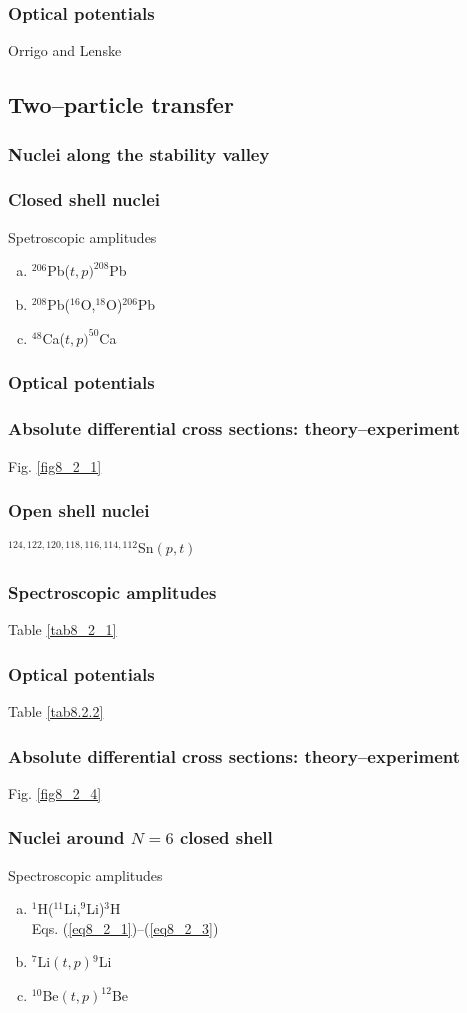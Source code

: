 \begin{subappendices}
\subsubsection{Optical potentials}
Orrigo and Lenske
\subsection{Two--particle transfer}
\subsubsection{Nuclei along the stability valley}
\subsubsection{Closed shell nuclei}
Spetroscopic amplitudes
\begin{enumerate}[a)]
\item{$^{206}$Pb($t,p)^{208}$Pb}
\item{$^{208}$Pb($^{16}$O,$^{18}$O)$^{206}$Pb}
\item{$^{48}$Ca($t,p)^{50}$Ca}
\end{enumerate}
\subsubsection{Optical potentials}
\subsubsection{Absolute differential cross sections: theory--experiment}
Fig. \ref{fig8_2_1}
\subsubsection{Open shell nuclei}
$^{124,122,120,118,116,114,112}$Sn$(p,t)$
\subsubsection{Spectroscopic amplitudes}
Table \ref{tab8_2_1}
\subsubsection{Optical potentials}
Table \ref{tab8.2.2}
\subsubsection{Absolute differential cross sections: theory--experiment}
Fig. \ref{fig8_2_4}
\subsubsection{Nuclei around $N=6$ closed shell}
Spectroscopic amplitudes
\begin{enumerate}[a)]
\item{$^{1}$H($^{11}$Li,$^{9}$Li)$^{3}$H\\ Eqs. (\ref{eq8_2_1})--(\ref{eq8_2_3})}
\item{$^{7}$Li$(t,p)$$^9$Li }
\item{$^{10}$Be$(t,p)^{12}$Be}
\end{enumerate}

\end{subappendices}
